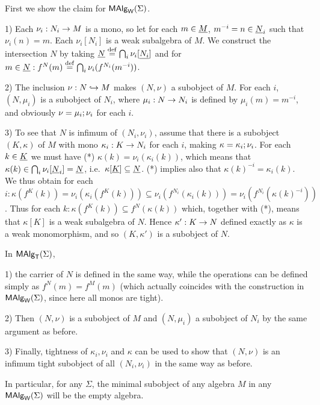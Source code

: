 \documentclass[10pt]{article}
\begin{document}
\begin{Proof}
First we show the claim for $\mbox{\rm\sf MAlg}_{\sf W}(\Sigma)$.

1) Each $\nu_i:N_i\rightarrow M$ is a mono, so let for each $m\in\underline {M}$,
$m^{-i}=n\in \underline {N}_i$ such that $\nu_i(n)=m$. Each $\nu_i[N_i]$ is
a weak subalgebra of $M$.  We construct the intersection $N$ by taking
$\underline {N}\stackrel{{\rm \tiny{def}}}= \bigcap_i \nu_i[\underline {N_i}]$ and for $m\in\underline {N}:
f^N(m) \stackrel{{\rm \tiny{def}}}= \bigcap_i \nu_i(f^{N_i}(m^{-i}))$.

2) The inclusion $\nu: N \hookrightarrow M$ makes $(N, \nu)$ a subobject of
$M$. For each $i$, $(N, \mu_i)$ is a subobject of $N_i$, where
$\mu_i:N\rightarrow N_i$ is defined by $\mu_i(m) = m^{-i}$, and obviously
$\nu = \mu_i;\nu_i$ for each $i$.

3) To see that $N$ is infimum of $(N_i,\nu_i)$, assume that there is a
subobject $(K,\kappa)$ of $M$ with mono $\kappa_i:K\rightarrow N_i$ for each
$i$, making $\kappa=\kappa_i;\nu_i$.  For each $k\in\underline {K}$
we must have (*) $\kappa(k)=\nu_i(\kappa_i(k))$,
which means that $\kappa(k)\in\bigcap_i \nu_i[\underline {N}_i]=\underline {N}$,
i.e.\ $\kappa[\underline {K}]\subseteq \underline {N}$.  (*) implies also that
$\kappa(k)^{-i}=\kappa_i(k)$. We thus obtain for each
$i:\kappa(f^K(k)) = \nu_i(\kappa_i(f^K(k))) \subseteq
\nu_i(f^{N_i}(\kappa_i(k))) = \nu_i(f^{N_i}(\kappa(k)^{-i}))$.  Thus
for each $k:\kappa(f^K(k))\subseteq f^N(\kappa(k))$ which,
together with (*), means that $\kappa[K]$ is a weak subalgebra of
$N$. Hence $\kappa':K\rightarrow N$ defined exactly as $\kappa$ is a weak
monomorphism, and so $(K,\kappa')$ is a subobject of $N$. 


In $\mbox{\rm\sf MAlg}_{\sf T}(\Sigma)$, 

1) the carrier of $N$ is defined in the same way, while the operations
can be defined simply as $f^N(m)=f^M(m)$ (which actually
coincides with the construction in $\mbox{\rm\sf MAlg}_{\sf W}(\Sigma)$, since here all monos are
tight).

2) Then $(N,\nu)$ is a subobject of $M$ and $(N,\mu_i)$ a subobject of
$N_i$ by the same argument as before. 

3) Finally, tightness of $\kappa_i, \nu_i$ and $\kappa$ can be used to
show that $(N,\nu)$ is an infimum tight subobject of all $(N_i,\nu_i)$
in the same way as before.
\end{Proof}

\noindent
In particular, for any $\Sigma$, the minimal subobject of any algebra
$M$ in any $\mbox{\rm\sf MAlg}_{\sf W}(\Sigma)$ will be the empty algebra. 
\end{document}
